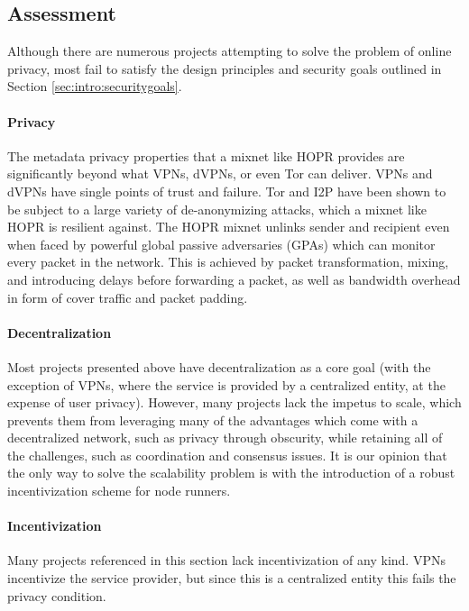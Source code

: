\subsection{Assessment}
\label{sec:intro:assessment}

Although there are numerous projects attempting to solve the problem of online privacy, most fail to satisfy the design principles and security goals outlined in Section \ref{sec:intro:securitygoals}.

\paragraph{Privacy} The metadata privacy properties that a mixnet like HOPR provides are significantly beyond what VPNs, dVPNs, or even Tor can deliver. VPNs and dVPNs have single points of trust and failure. Tor and I2P have been shown to be subject to a large variety of de-anonymizing attacks, which a mixnet like HOPR is resilient against. The HOPR mixnet unlinks sender and recipient even when faced by powerful global passive adversaries (GPAs) which can monitor every packet in the network. This is achieved by packet transformation, mixing, and introducing delays before forwarding a packet, as well as bandwidth overhead in form of cover traffic and packet padding.

\paragraph{Decentralization} Most projects presented above have decentralization as a core goal (with the exception of VPNs, where the service is provided by a centralized entity, at the expense of user privacy). However, many projects lack the impetus to scale, which prevents them from leveraging many of the advantages which come with a decentralized network, such as privacy through obscurity, while retaining all of the challenges, such as coordination and consensus issues. It is our opinion that the only way to solve the scalability problem is with the introduction of a robust incentivization scheme for node runners.

\paragraph{Incentivization} Many projects referenced in this section lack incentivization of any kind. VPNs incentivize the service provider, but since this is a centralized entity this fails the privacy condition.

